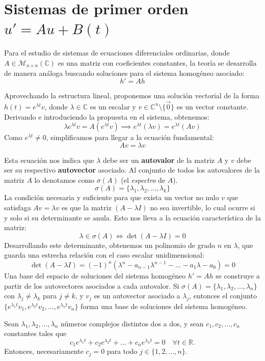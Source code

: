 ﻿\section{Sistemas de primer orden $u' = Au + B(t)$}

Para el estudio de sistemas de ecuaciones diferenciales ordinarias, donde $A \in \mathcal{M}_{n \times n}(\mathbb{C})$ es una matriz con coeficientes constantes, la teoría se desarrolla de manera análoga buscando soluciones para el sistema homogéneo asociado:
\[
    h' = Ah
\]

Aprovechando la estructura lineal, proponemos una solución vectorial de la forma $h(t) = e^{\lambda t}v$, donde $\lambda \in \mathbb{C}$ es un escalar y $v \in \mathbb{C}^n \setminus \{\vec{0}\}$ es un vector constante.
Derivando e introduciendo la propuesta en el sistema, obtenemos:
\[
    \lambda e^{\lambda t} v = A (e^{\lambda t} v) \implies e^{\lambda t} (\lambda v) = e^{\lambda t} (Av)
\]
Como $e^{\lambda t} \neq 0$, simplificamos para llegar a la ecuación fundamental:
\[
    Av = \lambda v
\]

Esta ecuación nos indica que $\lambda$ debe ser un \textbf{autovalor} de la matriz $A$ y $v$ debe ser su respectivo \textbf{autovector} asociado. Al conjunto de todos los autovalores de la matriz $A$ lo denotamos como $\sigma(A)$ (el \textit{espectro} de $A$).
\[
    \sigma(A) = \{\lambda_1, \lambda_2, \dots, \lambda_k\}
\]
La condición necesaria y suficiente para que exista un vector no nulo $v$ que satisfaga $Av = \lambda v$ es que la matriz $(A - \lambda I)$ no sea invertible, lo cual ocurre si y solo si su determinante se anula. Esto nos lleva a la ecuación característica de la matriz:
\[
    \lambda \in \sigma(A) \iff \det(A - \lambda I) = 0
\]
Desarrollando este determinante, obtenemos un polinomio de grado $n$ en $\lambda$, que guarda una estrecha relación con el caso escalar unidimensional:
\[
    \det(A - \lambda I) = (-1)^n \left( \lambda^n - a_{n-1} \lambda^{n-1} - \dots - a_1 \lambda - a_0 \right) = 0
\]
Una base del espacio de soluciones del sistema homogéneo $h' = Ah$ se construye a partir de los autovectores asociados a cada autovalor. Si $\sigma(A) = \{\lambda_1, \lambda_2, \dots, \lambda_n\}$ con $\lambda_j \neq \lambda_k$ para $j \neq k$, y $v_j$ es un autovector asociado a $\lambda_j$, entonces el conjunto $\{e^{\lambda_1 t} v_1, e^{\lambda_2 t} v_2, \dots, e^{\lambda_n t} v_n\}$ forma una base de soluciones del sistema homogéneo.
\begin{lema}
    Sean $\lambda_1, \lambda_2, \dots, \lambda_n$ números complejos distintos dos a dos, y sean $c_1, c_2, \dots, c_n$ constantes tales que 
    \[
        c_1 e^{\lambda_1 t} + c_2 e^{\lambda_2 t} + \dots + c_n e^{\lambda_n t} = 0 \quad \forall t \in \mathbb{R}.
    \]
    Entonces, necesariamente $c_j = 0$ para todo $j \in \{1, 2, \dots, n\}$.
\end{lema}


